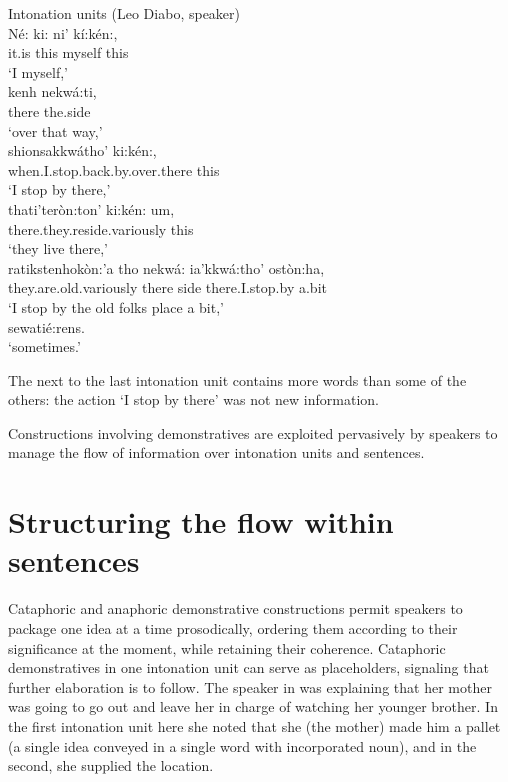\documentclass[output=paper,colorlinks,citecolor=brown]{langscibook}
\begin{document}
\ea Intonation units (Leo Diabo, speaker)\\\label{ex:mithun:7}
\gll  Né:     ki: ni' kí:kén:,\\
     {it.is} this myself this\\
\glt `I myself,'\medskip\\
\gll kenh nekwá:ti,\\
     there {the.side}\\
\glt `over that way,'\medskip\\
\gll shionsakkwátho' ki:kén:,\\
     {when.I.stop.back.by.over.there} this\\
\glt `I stop by there,'\medskip\\
\gll thati'teròn:ton' {ki:kén: um,}\\
     {there.they.reside.variously} this\\
\glt `they live there,'\medskip\\
\gll ratikstenhokòn:'a tho nekwá: ia'kkwá:tho' ostòn:ha,\\
     {they.are.old.variously} there side {there.I.stop.by} {a.bit}\\
\glt `I stop by the old folks place a bit,'\medskip\\
sewatié:rens.\\
\glt `sometimes.'
\z

The next to the last intonation unit contains more words than some of the others: the action `I stop by there' was not new information.

Constructions involving demonstratives are exploited pervasively by speakers to manage the flow of information over intonation units and sentences.

\section{Structuring the flow within sentences}

Cataphoric and anaphoric demonstrative constructions permit speakers to package one idea at a time prosodically, ordering them according to their significance at the moment, while retaining their coherence. Cataphoric demonstratives in one intonation unit can serve as placeholders, signaling that further elaboration is to follow. The speaker in  was explaining that her mother was going to go out and leave her in charge of watching her younger brother. In the first intonation unit here she noted that she (the mother) made him a pallet (a single idea conveyed in a single word with incorporated noun), and in the second, she supplied the location.
\end{document}
